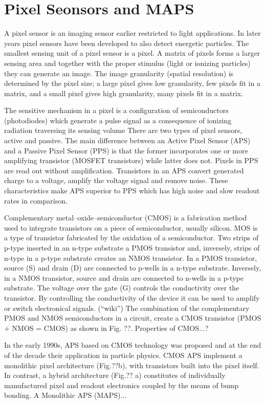\section{Pixel Seonsors and MAPS}
\label{sec:PixelSens&MAPS}

A pixel sensor is an imaging sensor earlier restricted to light applications. In later years pixel sensors have been developed to also detect energetic particles.
The smallest sensing unit of a pixel sensor is a pixel. A matrix of pixels forms a larger sensing area and together with the proper stimulus (light or ionizing particles) they can generate an image. The image granularity (spatial resolution) is determined by the pixel size; a large pixel gives low granularity, few pixels fit in a matrix, and a small pixel gives high granularity, many pixels fit in a matrix.

The sensitive mechanism in a pixel is a configuration of semiconductors (photodiodes) which generate a pulse signal as a consequence of ionizing radiation traversing its sensing volume
There are two types of pixel sensors, active and passive. The main difference between an Active Pixel Sensor (APS) and a Passive Pixel Sensor (PPS) is that the former incorporates one or more amplifying transistor (MOSFET transistors) while latter does not. Pixels in PPS are read out without amplification. Transistors in an APS convert generated charge to a voltage, amplify the voltage signal and remove noise. These characteristics make APS superior to PPS which has high noise and slow readout rates in comparison.

Complementary metal–oxide–semiconductor (CMOS) is a fabrication method used to integrate transistors on a piece of semiconductor, usually silicon. MOS is a type of transistor fabricated by the oxidation of a semiconductor. Two strips of p-type inserted in an n-type substrate a PMOS transistor and, inversely, strips of n-type in a p-type substrate creates an NMOS transistor. In a PMOS transistor, source (S) and drain (D) are connected to p-wells in a n-type substrate. Inversely, in a NMOS transistor, source and drain are connected to n-wells in a p-type substrate. The voltage over the gate (G) controls the conductivity over the transistor. By controlling the conductivity of the device it can be used to amplify or switch electronical signals. (“wiki”) The combination of the complementary PMOS and NMOS semiconductors in a circuit, create a CMOS transistor (PMOS + NMOS = CMOS) as shown in Fig. ??. Properties of CMOS...?

In the early 1990s, APS based on CMOS technology was proposed and at the end of the decade their application in particle physics. CMOS APS implement a monolithic pixel architecture (Fig.??b), with transistors built into the pixel itself. In contrast, a hybrid architecture (Fig.?? a) constitutes of individually manufactured pixel and readout electronics coupled by the means of bump bonding.
A Monolithic APS (MAPS)...
